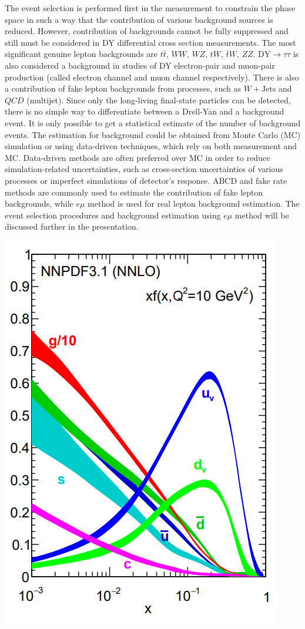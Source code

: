 \documentclass[a0,portrait]{a0poster}
\begin{document}
\begin{multicols}{2}
\begin{centering}
\begin{minipage}{0.63\linewidth}
		\vspace{0.5cm}
		The event selection is performed first in the measurement to constrain the phase space in such a way that the
		contribution of various background sources is reduced.
		However, contribution of backgrounds cannot be fully suppressed and still must be considered in DY differential
		cross section measurements.
		The most significant genuine lepton backgrounds are $t\bar{t}$, $WW$, $WZ$, $tW$, $\bar{t}W$, $ZZ$.
		$\mathrm{DY}\rightarrow\tau\tau$ is also considered a background in studies of DY electron-pair and muon-pair production 
		(called electron channel and muon channel respectively).
		There is also a contribution of fake lepton backgrounds from processes, such as $W+\mathrm{Jets}$ and $QCD$ (multijet).
		Since only the long-living final-state particles can be detected, there is no simple way to differentiate between
		a Drell-Yan and a background event.
		It is only possible to get a statistical estimate of the number of background events.
		The estimation for background could be obtained from Monte Carlo (MC) simulation or using data-driven techniques,
		which rely on both measurement and MC.
		Data-driven methods are often preferred over MC in order to reduce simulation-related uncertainties, such as
		cross-section uncertainties of various processes or imperfect simulations of detector's response.
		ABCD and fake rate methods are commonly used to estimate the contribution of fake lepton backgrounds, while $e\mu$
		method is used for real lepton background estimation.
		The event selection procedures and background estimation using $e\mu$ method will be discussed further in the presentation.
	\end{minipage}
	\hfill
	\begin{minipage}{0.33\linewidth}\centering
		\includegraphics[width=0.8\linewidth]{NNPDF10.PNG}

\end{minipage}
\end{centering}
\end{multicols}
\end{document}
